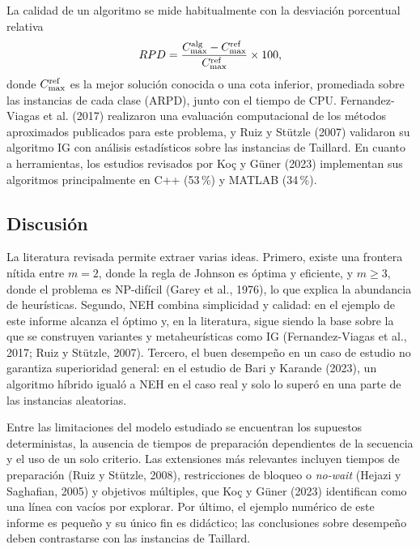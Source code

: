 La calidad de un algoritmo se mide habitualmente con la desviación porcentual relativa
\begin{equation}\label{eq:rpd}
RPD = \frac{C_{\max}^{\text{alg}} - C_{\max}^{\text{ref}}}{C_{\max}^{\text{ref}}}\times 100,
\end{equation}
donde $C_{\max}^{\text{ref}}$ es la mejor solución conocida o una cota inferior, promediada
sobre las instancias de cada clase (ARPD), junto con el tiempo de CPU. Fernandez-Viagas et al.
(2017) realizaron una evaluación computacional de los métodos aproximados publicados para este
problema, y Ruiz y Stützle (2007) validaron su algoritmo IG con análisis estadísticos sobre
las instancias de Taillard. En cuanto a herramientas, los estudios revisados por Koç y Güner
(2023) implementan sus algoritmos principalmente en C++ (53\,\%) y MATLAB (34\,\%).

\subsection{Discusión}

La literatura revisada permite extraer varias ideas. Primero, existe una frontera nítida
entre $m=2$, donde la regla de Johnson es óptima y eficiente, y $m\ge 3$, donde el problema es
NP-difícil (Garey et al., 1976), lo que explica la abundancia de heurísticas. Segundo,
NEH combina simplicidad y calidad: en el ejemplo de este informe alcanza el óptimo y, en la
literatura, sigue siendo la base sobre la que se construyen variantes y metaheurísticas
como IG (Fernandez-Viagas et al., 2017; Ruiz y Stützle, 2007). Tercero, el
buen desempeño en un caso de estudio no garantiza superioridad general: en el estudio de
Bari y Karande (2023), un algoritmo híbrido igualó a NEH en el caso real y solo lo superó
en una parte de las instancias aleatorias.

Entre las limitaciones del modelo estudiado se encuentran los supuestos deterministas, la
ausencia de tiempos de preparación dependientes de la secuencia y el uso de un solo
criterio. Las extensiones más relevantes incluyen tiempos de preparación (Ruiz y Stützle,
2008), restricciones de bloqueo o \textit{no-wait} (Hejazi y Saghafian, 2005) y objetivos
múltiples, que Koç y Güner (2023) identifican como una línea con vacíos por explorar. Por
último, el ejemplo numérico de este informe es pequeño y su único fin es didáctico; las
conclusiones sobre desempeño deben contrastarse con las instancias de Taillard.

